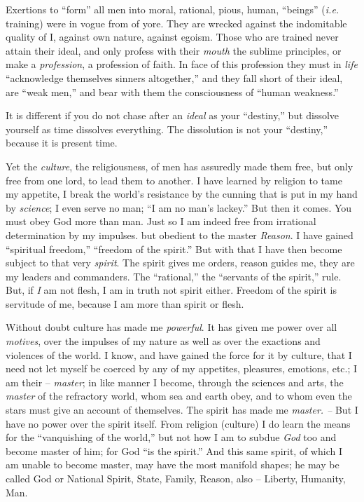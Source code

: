 Exertions to ``form'' all men into moral, rational, pious, human, 
``beings'' (\textit{i.e.} training) were in vogue from of yore. They are 
wrecked against the indomitable quality of I, against own nature, against 
egoism. Those who are trained never attain their ideal, and only profess with 
their \textit{mouth} the sublime principles, or make a \textit{profession}, a 
profession of faith. In face of this profession they must in \textit{life} 
``acknowledge themselves sinners altogether,'' and they fall short of their 
ideal, are ``weak men,'' and bear with them the consciousness of ``human 
weakness.''

It is different if you do not chase after an \textit{ideal} as your 
``destiny,'' but dissolve yourself as time dissolves everything. The 
dissolution is not your ``destiny,'' because it is present time.

Yet the \textit{culture}, the religiousness, of men has assuredly made them 
free, but only free from one lord, to lead them to another. I have learned by 
religion to tame my appetite, I break the world's resistance by the cunning 
that is put in my hand by \textit{science}; I even serve no man; ``I am no 
man's lackey.'' But then it comes. You must obey God more than man. Just so I 
am indeed free from irrational determination by my impulses. but obedient to 
the master \textit{Reason}. I have gained ``spiritual freedom,'' ``freedom 
of the spirit.'' But with that I have then become subject to that very 
\textit{spirit}. The spirit gives me orders, reason guides me, they are my 
leaders and commanders. The ``rational,'' the ``servants of the spirit,'' 
rule. But, if \textit{I} am not flesh, I am in truth not spirit either. 
Freedom of the spirit is servitude of me, because I am more than spirit or 
flesh.

Without doubt culture has made me \textit{powerful}. It has given me power 
over all \textit{motives}, over the impulses of my nature as well as over the 
exactions and violences of the world. I know, and have gained the force for it 
by culture, that I need not let myself be coerced by any of my appetites, 
pleasures, emotions, etc.; I am their -- \textit{master}; in like manner I 
become, through the sciences and arts, the \textit{master} of the refractory 
world, whom sea and earth obey, and to whom even the stars must give an 
account of themselves. The spirit has made me \textit{master. --} But I have 
no power over the spirit itself. From religion (culture) I do learn the means 
for the ``vanquishing of the world,'' but not how I am to subdue 
\textit{God} too and become master of him; for God ``is the spirit.'' And 
this same spirit, of which I am unable to become master, may have the most 
manifold shapes; he may be called God or National Spirit, State, Family, 
Reason, also -- Liberty, Humanity, Man.

